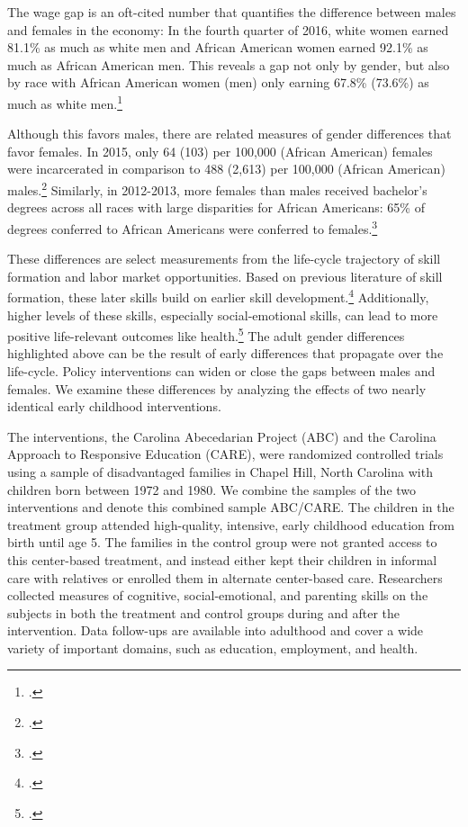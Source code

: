 The wage gap is an oft-cited number that quantifies the difference between males and females in the economy: In the fourth quarter of 2016, white women earned 81.1\% as much as white men and African American women earned 92.1\% as much as African American men. This reveals a gap not only by gender, but also by race with African American women (men) only earning 67.8\% (73.6\%) as much as white men.\footnote{\citet{USDPTL_2017_Wage_News-Release}.}

 Although this favors males, there are related measures of gender differences that favor females. In 2015, only 64 (103) per 100,000 (African American) females were incarcerated in comparison to 488 (2,613) per 100,000 (African American) males.\footnote{\citet{UDOJ_2016_PrisonersStatistics_Bulletin}.} Similarly, in 2012-2013, more females than males received bachelor's degrees across all races with large disparities for African Americans: 65\% of degrees conferred to African Americans were conferred to females.\footnote{\citet{UDOE_2016_Statistics_Report}.}

These differences are select measurements from the life-cycle trajectory of skill formation and labor market opportunities. Based on previous literature of skill formation, these later skills build on earlier skill development.\footnote{\citet{Cunha_Heckman_2008_JHR,Cunha_Heckman_etal_2010_est_tech_cognoncog}.} Additionally, higher levels of these skills, especially social-emotional skills, can lead to more positive life-relevant outcomes like health.\footnote{\citet{Heckman_2008_EI,Heckman_Pinto_etal_2013_PerryFactor,Conti_etal_2016_LongTermHealth}.} The adult gender differences highlighted above can be the result of early differences that propagate over the life-cycle. Policy interventions can widen or close the gaps between males and females. We examine these differences by analyzing the effects of two nearly identical early childhood interventions. 

The interventions, the Carolina Abecedarian Project (ABC) and the Carolina Approach to Responsive Education (CARE), were randomized controlled trials using a sample of disadvantaged families in Chapel Hill, North Carolina with children born between 1972 and 1980. We combine the samples of the two interventions and denote this combined sample ABC/CARE. The children in the treatment group attended high-quality, intensive, early childhood education from birth until age 5. The families in the control group were not granted access to this center-based treatment, and instead either kept their children in informal care with relatives or enrolled them in alternate center-based care. Researchers collected measures of cognitive, social-emotional, and parenting skills on the subjects in both the treatment and control groups during and after the intervention. Data follow-ups are available into adulthood and cover a wide variety of important domains, such as education, employment, and health.

